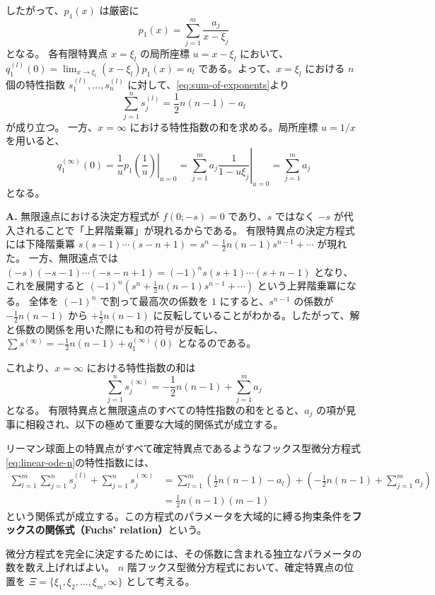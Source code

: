 したがって、$p_{1}(x)$ は厳密に
\[
p_{1}(x) = \sum_{j=1}^{m} \frac{a_{j}}{x-\xi_{j}}
\]
となる。
各有限特異点 $x=\xi_{l}$ の局所座標 $u = x-\xi_{l}$ において、$q_{1}^{(l)}(0) = \lim_{x \to \xi_{l}} (x-\xi_{l})p_{1}(x) = a_{l}$ である。よって、$x=\xi_{l}$ における $n$ 個の特性指数 $s_{1}^{(l)}, \dots, s_{n}^{(l)}$ に対して、\eqref{eq:sum-of-exponents}より
\[
\sum_{j=1}^{n} s_{j}^{(l)} = \frac{1}{2}n(n-1) - a_{l}
\]
が成り立つ。
一方、$x=\infty$ における特性指数の和を求める。局所座標 $u=1/x$ を用いると、
\[
q_{1}^{(\infty)}(0) = \left. \frac{1}{u}p_{1}\left(\frac{1}{u}\right) \right|_{u=0} = \left. \sum_{j=1}^{m} a_{j}\frac{1}{1-u\xi_{j}} \right|_{u=0} = \sum_{j=1}^{m} a_{j}
\]
となる。

\begin{Q}
\textbf{A.} 無限遠点における決定方程式が $f(0; -s) = 0$ であり、$s$ ではなく $-s$ が代入されることで「上昇階乗冪」が現れるからである。
有限特異点の決定方程式には下降階乗冪 $s(s-1)\cdots(s-n+1) = s^{n} - \frac{1}{2}n(n-1)s^{n-1} + \cdots$ が現れた。
一方、無限遠点では $(-s)(-s-1)\cdots(-s-n+1) = (-1)^{n} s(s+1)\cdots(s+n-1)$ となり、これを展開すると $(-1)^{n} (s^{n} + \frac{1}{2}n(n-1)s^{n-1} + \cdots)$ という上昇階乗冪になる。
全体を $(-1)^{n}$ で割って最高次の係数を $1$ にすると、$s^{n-1}$ の係数が $-\frac{1}{2}n(n-1)$ から $+\frac{1}{2}n(n-1)$ に反転していることがわかる。したがって、解と係数の関係を用いた際にも和の符号が反転し、$\sum s^{(\infty)} = -\frac{1}{2}n(n-1) + q_{1}^{(\infty)}(0)$ となるのである。
\end{Q}

これより、$x=\infty$ における特性指数の和は
\[
\sum_{j=1}^{n}s_{j}^{(\infty)} = -\frac{1}{2}n(n-1) + \sum_{j=1}^{m} a_{j}
\]
となる。
有限特異点と無限遠点のすべての特性指数の和をとると、$a_{j}$ の項が見事に相殺され、以下の極めて重要な大域的関係式が成立する。

\begin{proposition}\label{prop:fuchs_relation}
リーマン球面上の特異点がすべて確定特異点であるようなフックス型微分方程式\eqref{eq:linear-ode-n}の特性指数には、
\begin{align*}
\sum_{l=1}^{m}\sum_{j=1}^{n} s_{j}^{(l)} + \sum_{j=1}^{n} s_{j}^{(\infty)} &= \sum_{l=1}^{m} \left( \frac{1}{2}n(n-1) - a_{l} \right) + \left( -\frac{1}{2}n(n-1) + \sum_{j=1}^{m} a_{j} \right) \\
&= \frac{1}{2}n(n-1)(m-1)
\end{align*}
という関係式が成立する。この方程式のパラメータを大域的に縛る拘束条件を\textbf{フックスの関係式（Fuchs' relation）}という。
\end{proposition}
微分方程式を完全に決定するためには、その係数に含まれる独立なパラメータの数を数え上げればよい。
$n$ 階フックス型微分方程式において、確定特異点の位置を $\Xi=\{\xi_{1}, \xi_{2}, \dots, \xi_{m}, \infty\}$ として考える。

